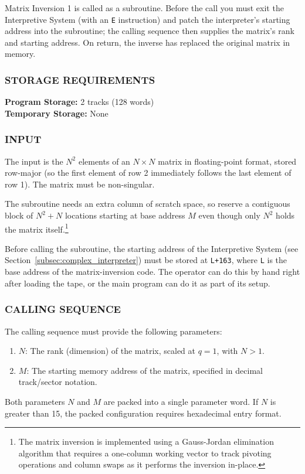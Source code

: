 Matrix Inversion 1 is called as a subroutine. Before the call you must exit the Interpretive System (with an \texttt{E} instruction) and patch the interpreter's starting address into the subroutine; the calling sequence then supplies the matrix's rank and starting address. On return, the inverse has replaced the original matrix in memory.

\subsubsection*{STORAGE REQUIREMENTS}
\textbf{Program Storage:} 2 tracks (128 words) \\
\textbf{Temporary Storage:} None

\subsubsection*{INPUT}
The input is the $N^2$ elements of an $N \times N$ matrix in floating-point format, stored row-major (so the first element of row 2 immediately follows the last element of row 1). The matrix must be non-singular.

The subroutine needs an extra column of scratch space, so reserve a contiguous block of $N^2 + N$ locations starting at base address $M$ even though only $N^2$ holds the matrix itself.\footnote{The matrix inversion is implemented using a Gauss-Jordan elimination algorithm that requires a one-column working vector to track pivoting operations and column swaps as it performs the inversion in-place.}

Before calling the subroutine, the starting address of the Interpretive System (see Section~\ref{subsec:complex_interpreter}) must be stored at \texttt{L+163}, where \texttt{L} is the base address of the matrix-inversion code. The operator can do this by hand right after loading the tape, or the main program can do it as part of its setup.

\subsubsection*{CALLING SEQUENCE}
The calling sequence must provide the following parameters:
\begin{enumerate}[label=\arabic*., leftmargin=1.5em, itemsep=2pt]
    \item $N$: The rank (dimension) of the matrix, scaled at $q = 1$, with $N > 1$.
    \item $M$: The starting memory address of the matrix, specified in decimal track/sector notation.
\end{enumerate}
Both parameters $N$ and $M$ are packed into a single parameter word. If $N$ is greater than 15, the packed configuration requires hexadecimal entry format. 

